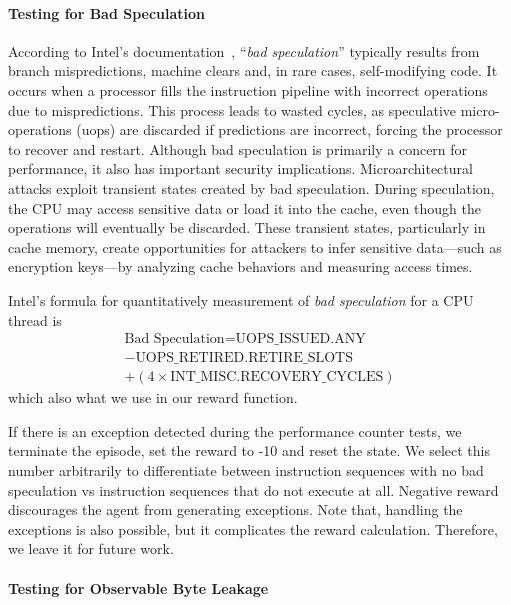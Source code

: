 \paragraph{Testing for Bad Speculation}
According to Intel's documentation~\cite{intel_vtune_2023}, ``\textit{bad speculation}'' typically results from branch mispredictions, machine clears and, in rare cases, self-modifying code. 
It occurs when a processor fills the instruction pipeline with incorrect operations due to mispredictions. This process leads to wasted cycles, as speculative micro-operations (uops) are discarded if predictions are incorrect, forcing the processor to recover and restart. Although bad speculation is primarily a concern for performance, it also has important security implications.
%
Microarchitectural attacks exploit transient states created by bad speculation. During speculation, the CPU may access sensitive data or load it into the cache, even though the operations will eventually be discarded. These transient states, particularly in cache memory, create opportunities for attackers to infer sensitive data—such as encryption keys—by analyzing cache behaviors and measuring access times. %

Intel's formula for quantitatively measurement of \textit{bad speculation} for a CPU thread is
\begin{multline}
    \text{Bad\ Speculation} = \text{UOPS\_ISSUED.ANY} \\
    - \text{UOPS\_RETIRED.RETIRE\_SLOTS} \\
    + \left( 4 \times \text{INT\_MISC.RECOVERY\_CYCLES} \right)
\end{multline}
which also what we use in our reward function. 

If there is an exception detected during the performance counter tests, we terminate the episode, set the reward to -10 and reset the state. We select this number arbitrarily to differentiate between instruction sequences with no bad speculation vs instruction sequences that do not execute at all. Negative reward discourages the agent from generating exceptions. Note that, handling the exceptions is also possible, but it complicates the reward calculation. Therefore, we leave it for future work.

\paragraph{Testing for Observable Byte Leakage}


